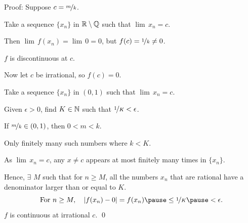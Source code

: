 \documentclass[10pt,aspectratio=149]{beamer}
\begin{document}
\begin{frame}

Proof:
Suppose $c = \nicefrac{m}{k}$.

\pause
Take a sequence $\{ x_n \}$ in ${\mathbb{R}} \setminus {\mathbb{Q}}$ such that $\lim\, x_n = c$.

\pause
Then $\lim\, f(x_n) = \lim \, 0 = 0$, but $f(c) = \nicefrac{1}{k} \not= 0$.

\pause
\thus \quad $f$ is discontinuous at $c$.

\pause
\medskip

Now let $c$ be irrational, so $f(c) = 0$.

\pause
Take a sequence $\{ x_n \}$ in $(0,1)$ such that $\lim\, x_n = c$.

\pause
Given $\epsilon > 0$, find $K \in {\mathbb{N}}$ such that $\nicefrac{1}{K} < \epsilon$.

\pause
If $\nicefrac{m}{k} \in (0,1)$, then $0 < m < k$.

\pause
Only finitely many such numbers where $k < K$.

\pause
As $\lim\, x_n = c$, any $x \not= c$ appears at most
finitely many times in $\{ x_n \}$.

\pause
Hence,
$\exists$ $M$ such that for $n \geq M$, all the numbers $x_n$
that are rational
have a denominator larger than or equal to $K$.
\pause
\begin{equation*}
\text{For } n \geq M, \quad
\abs{f(x_n) - 0} = f(x_n)
\pause
\leq \nicefrac{1}{K}
\pause
< \epsilon .
\end{equation*}
\pause
\thus \quad $f$ is continuous at irrational $c$.
\qed

\end{frame}
\end{document}
